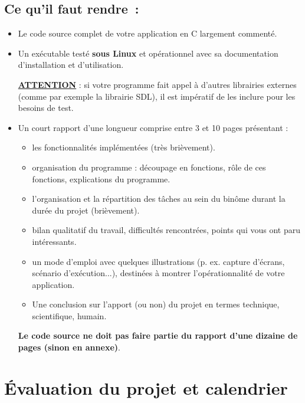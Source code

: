 \documentclass[10pt]{article}
\begin{document}
\subsection*{Ce qu'il faut rendre~:}
\begin{itemize}
\item Le code source complet de votre application en C largement commenté.

\item Un exécutable test\'e \textbf{sous Linux} et opérationnel avec sa documentation d'installation et d'utilisation. 

\underline{\bf ATTENTION} :
si votre programme fait appel à d'autres librairies externes (comme par exemple 
la librairie SDL), il est impératif de les inclure pour les besoins de test. 

\item Un court rapport d'une longueur comprise entre 3 et 10 pages présentant :
  \begin{itemize}
    \item les fonctionnalités implémentées (très brièvement).
    \item organisation du programme : découpage en fonctions, rôle de 
      ces fonctions, explications du programme. 
    \item l'organisation et la répartition des tâches au sein du binôme 
      durant la durée du projet (brièvement).
    \item bilan qualitatif du travail, difficultés rencontrées, points qui 
      vous ont paru intéressants. 
    \item un mode d'emploi avec quelques illustrations (p. ex. capture d'écrans, 
      scénario d'exécution...), destinées à montrer l'opérationnalité 
      de votre application.
    \item Une conclusion sur l'apport (ou non) du projet en termes technique,
      scientifique, humain. 
  \end{itemize}

\textbf{Le code source ne doit pas faire partie du rapport d'une dizaine de pages 
(sinon en annexe)}.
\end{itemize}

\section{Évaluation du projet et calendrier}
\end{document}
